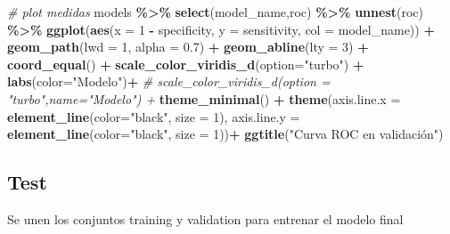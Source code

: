 \documentclass[12pt,a4paper,]{book}
\newenvironment{Shaded}{\begin{snugshade}}{\end{snugshade}}
\newcommand{\AttributeTok}[1]{\textcolor[rgb]{0.13,0.29,0.53}{#1}}
\newcommand{\CommentTok}[1]{\textcolor[rgb]{0.56,0.35,0.01}{\textit{#1}}}
\newcommand{\DecValTok}[1]{\textcolor[rgb]{0.00,0.00,0.81}{#1}}
\newcommand{\FloatTok}[1]{\textcolor[rgb]{0.00,0.00,0.81}{#1}}
\newcommand{\FunctionTok}[1]{\textcolor[rgb]{0.13,0.29,0.53}{\textbf{#1}}}
\newcommand{\NormalTok}[1]{#1}
\newcommand{\SpecialCharTok}[1]{\textcolor[rgb]{0.81,0.36,0.00}{\textbf{#1}}}
\newcommand{\StringTok}[1]{\textcolor[rgb]{0.31,0.60,0.02}{#1}}
\numberwithin{dummy}{section}
\theoremstyle{ocrenumbox}
\theoremstyle{blacknumex}
\theoremstyle{blacknumbox}
\theoremstyle{ocrenum}
\theoremstyle{ocrenum}
\begin{document}
\begin{Shaded}
\begin{Highlighting}[]
\CommentTok{\# plot medidas}
\NormalTok{models }\SpecialCharTok{\%\textgreater{}\%} \FunctionTok{select}\NormalTok{(model\_name,roc) }\SpecialCharTok{\%\textgreater{}\%} \FunctionTok{unnest}\NormalTok{(roc) }\SpecialCharTok{\%\textgreater{}\%} 
  \FunctionTok{ggplot}\NormalTok{(}\FunctionTok{aes}\NormalTok{(}\AttributeTok{x =} \DecValTok{1} \SpecialCharTok{{-}}\NormalTok{ specificity, }\AttributeTok{y =}\NormalTok{ sensitivity, }\AttributeTok{col =}\NormalTok{ model\_name)) }\SpecialCharTok{+} 
  \FunctionTok{geom\_path}\NormalTok{(}\AttributeTok{lwd =} \DecValTok{1}\NormalTok{, }\AttributeTok{alpha =} \FloatTok{0.7}\NormalTok{) }\SpecialCharTok{+}
  \FunctionTok{geom\_abline}\NormalTok{(}\AttributeTok{lty =} \DecValTok{3}\NormalTok{) }\SpecialCharTok{+} 
  \FunctionTok{coord\_equal}\NormalTok{() }\SpecialCharTok{+} 
  \FunctionTok{scale\_color\_viridis\_d}\NormalTok{(}\AttributeTok{option=}\StringTok{"turbo"}\NormalTok{) }\SpecialCharTok{+}
  \FunctionTok{labs}\NormalTok{(}\AttributeTok{color=}\StringTok{"Modelo"}\NormalTok{)}\SpecialCharTok{+}
  \CommentTok{\# scale\_color\_viridis\_d(option = "turbo",name="Modelo") +}
  \FunctionTok{theme\_minimal}\NormalTok{() }\SpecialCharTok{+} 
  \FunctionTok{theme}\NormalTok{(}\AttributeTok{axis.line.x =} \FunctionTok{element\_line}\NormalTok{(}\AttributeTok{color=}\StringTok{"black"}\NormalTok{, }\AttributeTok{size =} \DecValTok{1}\NormalTok{),}
        \AttributeTok{axis.line.y =} \FunctionTok{element\_line}\NormalTok{(}\AttributeTok{color=}\StringTok{"black"}\NormalTok{, }\AttributeTok{size =} \DecValTok{1}\NormalTok{))}\SpecialCharTok{+}
  \FunctionTok{ggtitle}\NormalTok{(}\StringTok{"Curva ROC en validación"}\NormalTok{)}
\end{Highlighting}
\end{Shaded}

\hypertarget{test}{%
\subsection{Test}\label{test}}

Se unen los conjuntos training y validation para entrenar el modelo
final
\end{document}
